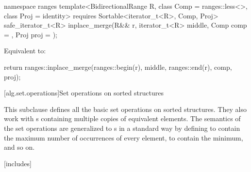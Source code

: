 \begin{itemdecl}
namespace ranges {
  template<BidirectionalRange R, class Comp = ranges::less<>, class Proj = identity>
    requires Sortable<iterator_t<R>, Comp, Proj>
    safe_iterator_t<R>
      inplace_merge(R&& r, iterator_t<R> middle, Comp comp = {}, Proj proj = {});
}
\end{itemdecl}

\begin{itemdescr}
\pnum
\effects
Equivalent to:
\begin{codeblock}
return ranges::inplace_merge(ranges::begin(r), middle, ranges::end(r), comp, proj);
\end{codeblock}
\end{itemdescr}

[alg.set.operations]{Set operations on sorted structures}

\pnum
This subclause defines all the basic set operations on sorted structures.
They also work with s
containing multiple copies of equivalent elements.
The semantics of the set operations are generalized to s
in a standard way by defining 
to contain the maximum number of occurrences of every element,
 to contain the minimum, and so on.

[includes]{}

